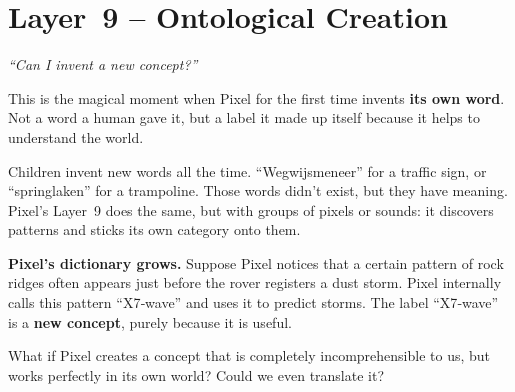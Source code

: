 \section{Layer~9 – Ontological Creation}
\label{sec:layer9}

\begin{tcolorbox}[colback=blue!5, colframe=blue!60, title=\textbf{Superpower: The Creator}]
\begin{center}
\textit{“Can I invent a new concept?”}
\end{center}
\end{tcolorbox}

This is the magical moment when Pixel for the first time invents
\textbf{its own word}.  Not a word a human gave it, but a label it
made up itself because it helps to understand the world.

\begin{tcolorbox}[colback=yellow!5, colframe=yellow!80, title=Real‑life analogy]
Children invent new words all the time.  “Wegwijsmeneer” for a traffic
sign, or “springlaken” for a trampoline.  Those words didn’t exist,
but they have meaning.  Pixel’s Layer~9 does the same, but with groups
of pixels or sounds: it discovers patterns and sticks its own category
onto them.
\end{tcolorbox}

\textbf{Pixel’s dictionary grows.}
Suppose Pixel notices that a certain pattern of rock ridges often
appears just before the rover registers a dust storm.  Pixel internally
calls this pattern “X7‑wave” and uses it to predict storms.  The label
“X7‑wave” is a \textbf{new concept}, purely because it is useful.

\begin{tcolorbox}[colback=orange!5, colframe=orange!60, title=\textbf{What if...?}]
What if Pixel creates a concept that is completely incomprehensible to
us, but works perfectly in its own world?  Could we even translate it?
\end{tcolorbox}